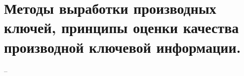 \section{Методы выработки производных ключей, принципы оценки качества производной ключевой информации.}

--